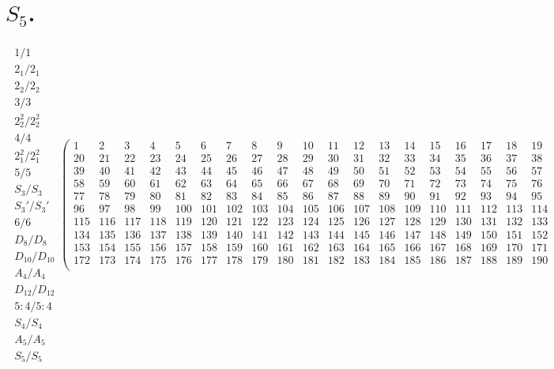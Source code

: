 \documentclass[11pt,a4paper]{amsart}
\begin{document}
\section*{$S_5$.}
\tiny

\begin{align*}
  \begin{array}{c}%
1/1 \\ \hline
2_1/2_1 \\ \hline
2_2/2_2 \\ \hline
3/3 \\ \hline
2^2_2/2^2_2 \\ \hline
4/4 \\ \hline
2^2_1/2^2_1 \\ \hline
5/5 \\ \hline
S_3/S_3 \\ \hline
S_3'/S_3' \\ \hline
6/6 \\ \hline
D_8/D_8 \\ \hline
D_{10}/D_{10} \\ \hline
A_4/A_4 \\ \hline
D_{12}/D_{12} \\ \hline
5{:}4/5{:}4 \\ \hline
S_4/S_4 \\ \hline
A_5/A_5 \\ \hline
S_5/S_5
\end{array}%
  \left(\begin{array}{r|r|r|r|r|r|r|r|r|r|r|r|r|r|r|r|r|r|r}%
1&2&3&4&5&6&7&8&9&10&11&12&13&14&15&16&17&18&19\\%
\hline
20&21&22&23&24&25&26&27&28&29&30&31&32&33&34&35&36&37&38\\%
\hline
39&40&41&42&43&44&45&46&47&48&49&50&51&52&53&54&55&56&57\\%
\hline
58&59&60&61&62&63&64&65&66&67&68&69&70&71&72&73&74&75&76\\%
\hline
77&78&79&80&81&82&83&84&85&86&87&88&89&90&91&92&93&94&95\\%
\hline
96&97&98&99&100&101&102&103&104&105&106&107&108&109&110&111&112&113&114\\%
\hline
115&116&117&118&119&120&121&122&123&124&125&126&127&128&129&130&131&132&133\\%
\hline
134&135&136&137&138&139&140&141&142&143&144&145&146&147&148&149&150&151&152\\%
\hline
153&154&155&156&157&158&159&160&161&162&163&164&165&166&167&168&169&170&171\\%
\hline
172&173&174&175&176&177&178&179&180&181&182&183&184&185&186&187&188&189&190\\%

\end{array}
\end{align*}
\end{document}
